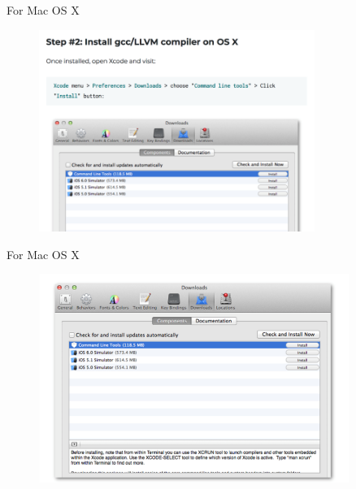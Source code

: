 \documentclass[handout]{beamer}
\begin{document}
\begin{frame}{For Mac OS X}
    \begin{figure}[h]
        \centering
        \includegraphics[width=0.8\textwidth]{figures/install_cmd_tools.png}
    \end{figure}
\end{frame}

\begin{frame}{For Mac OS X}
    \begin{figure}[h]
        \centering
        \includegraphics[width=0.9\textwidth]{figures/install_cmd_tools_2.png}
    \end{figure}
\end{frame}
\end{document}
